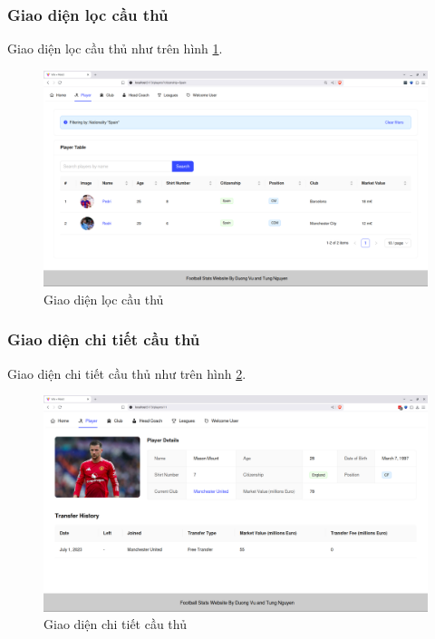 \documentclass[../BTL.tex]{subfiles}
\begin{document}
\subsubsection{Giao diện lọc cầu thủ}
Giao diện lọc cầu thủ như trên hình \ref{fig:user-player-filter}.
\begin{figure}
\centering
\includegraphics[width=1\linewidth]{Hinhve/user-player-filter.png}
\caption{Giao diện lọc cầu thủ}
\label{fig:user-player-filter}
\end{figure}

\subsubsection{Giao diện chi tiết cầu thủ}
Giao diện chi tiết cầu thủ như trên hình \ref{fig:user-player-detail}.
\begin{figure}
\centering
\includegraphics[width=1\linewidth]{Hinhve/user-player-detail.png}
\caption{Giao diện chi tiết cầu thủ}
\label{fig:user-player-detail}
\end{figure}
\end{document}
